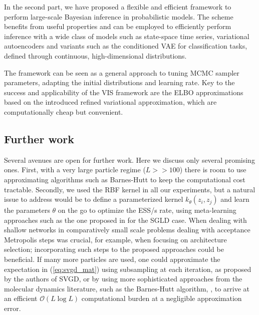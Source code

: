 In the second part, we have proposed a flexible and efficient framework to perform
large-scale Bayesian inference in probabilistic models. The scheme benefits from useful properties and can be 
employed to efficiently perform inference with a wide class of models such as state-space time series, variational autoencoders {and variants such as the conditioned VAE for classification tasks}, defined through continuous, high-dimensional distributions.

The framework can be seen as a general 
approach to tuning MCMC sampler parameters, adapting the initial distributions and learning rate. %
Key to the success and applicability of the VIS framework are the ELBO approximations based on the introduced refined variational approximation, which are computationally cheap but convenient. 

\subsection{Further work}

Several avenues are open for further work. Here we discuss only several promising ones. First, with a very large particle regime ($L >> 100$) there is room to use approximating algorithms such as Barnes-Hutt to keep the computational cost tractable.
Secondly, we used the RBF kernel in all our experiments, but a natural 
issue to address would be to define a parameterized kernel $k_{\theta} (z_i, z_j)$ and learn the parameters $\theta$ on the go to optimize the ESS/s rate, using meta-learning approaches such as the one proposed in \cite{gallego2019vis} for the SGLD case.
When dealing with shallow networks in comparatively small scale problems
\cite{Muller} dealing with acceptance Metropolis steps was crucial, for example,
when focusing on architecture selection; incorporating such steps
to the proposed approaches could be beneficial. 
If many more particles are  used, one could approximate the expectation in (\ref{eq:svgd_mat}) using subsampling at each iteration, as proposed by the authors of SVGD, or by using more sophisticated approaches from the molecular dynamics literature, such as the Barnes-Hutt algorithm, \cite{barnes1986hierarchical}, to arrive at an efficient $\mathcal{O}(L \log L)$ computational burden at a negligible approximation error.

